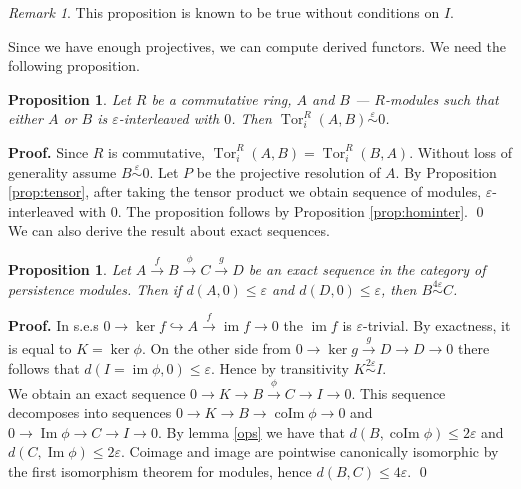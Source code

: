 \documentclass[english,12pt]{article}
\newcounter{stmcounter}[section]
\numberwithin{equation}{section}
\newtheorem{proposition}[stmcounter]{Proposition}
\theoremstyle{definition}
\theoremstyle{remark}
\newtheorem{remark}[stmcounter]{Remark}
\newenvironment{pf}{\noindent\textbf{Proof.}}{\qed}
\renewcommand{\leq}{\leqslant}
\begin{document}
\begin{remark}
 This proposition is known to be true without conditions on $I$. {\cite[Page 2]{Mitchell81}}
\end{remark}

Since we have enough projectives, we can compute derived functors. We need the following proposition.\\

\begin{proposition}
  \label{prop:tor}
  Let $R$ be a commutative ring, $A$ and $B$ --- $R$-modules such that either $A$ or $B$ is $\varepsilon$-interleaved with $0$. Then $\operatorname{Tor}_i^R(A,B) \stackrel{\varepsilon}{\sim} 0$.
\end{proposition}

\begin{pf}
  Since $R$ is commutative, $\operatorname{Tor}_i^R(A,B) = \operatorname{Tor}_i^R(B,A)$. Without loss of generality assume $B \stackrel{\varepsilon}{\sim} 0$. Let $P$ be the projective resolution of $A$. By Proposition \ref{prop:tensor}, after taking the tensor product we obtain sequence of modules, $\varepsilon$-interleaved with $0$. The proposition follows by Proposition \ref{prop:hominter}.
\end{pf}\\

We can also derive the result about exact sequences.\\

\begin{proposition}
  \label{major}
  Let $A \xrightarrow{f} B \xrightarrow{\phi} C \xrightarrow{g} D$ be an exact sequence in the category of persistence modules. Then if $d(A,0) \leq \varepsilon$ and $d(D,0) \leq \varepsilon$, then $B \stackrel{4\varepsilon}{\sim} C$.
\end{proposition}

\begin{pf}
  In s.e.s $0 \to \ker{f} \hookrightarrow A \xrightarrow{f} \operatorname{im}f \to 0$ the $\operatorname{im}f$ is $\varepsilon$-trivial. By exactness, it is equal to $K = \ker \phi$. On the other side from $0 \to \ker{g} \xrightarrow{g} D \to D \to 0$ there follows that $d(I = \operatorname{im} \phi, 0) \leq \varepsilon$. Hence by transitivity $K \stackrel{2\varepsilon}{\sim} I$.\\

  We obtain an exact sequence $0 \to K \to B \xrightarrow{\phi} C \to I \to 0$. This sequence decomposes into sequences $0 \to K \to B \to \operatorname{coIm}\phi \to 0$ and $0 \to \operatorname{Im}\phi \to C \to I \to 0$. By lemma \ref{ops} we have that $d(B,\operatorname{coIm}\phi) \leq 2\varepsilon$ and $d(C,\operatorname{Im}\phi) \leq 2\varepsilon$. Coimage and image are pointwise canonically isomorphic by the first isomorphism theorem for modules, hence $d(B, C) \leq 4\varepsilon$.
\end{pf}\\
\end{document}
